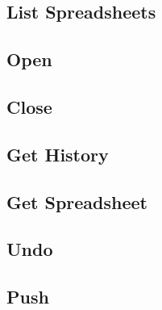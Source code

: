 \subsection{List Spreadsheets}
\label{sec:message:list}


\subsection{Open}
\label{sec:message:open}


\subsection{Close}
\label{sec:message:close}


\subsection{Get History}
\label{sec:message:get_history}


\subsection{Get Spreadsheet}
\label{sec:message:get_spreadsheet}


\subsection{Undo}
\label{sec:message:undo}


\subsection{Push}
\label{sec:message:push}

